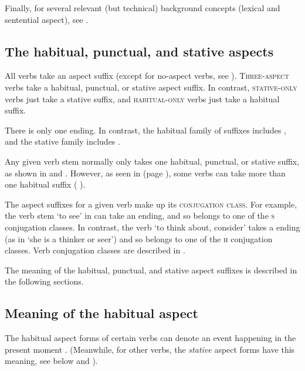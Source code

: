 Finally, for several relevant (but technical) background concepts (lexical and sentential aspect), see .



\subsection{The habitual, punctual, and stative aspects} \label{The habitual, punctual and stative aspects}
All verbs take an aspect suffix (except for no-aspect verbs, see ). \textsc{Three-aspect} verbs take a habitual, punctual, or stative aspect suffix. In contrast, \textsc{stative-only} verbs just take a stative suffix, and \textsc{habitual-only} verbs just take a habitual suffix.

There is only one  {\punctual} ending. In contrast, the habitual family of suffixes includes , and the stative family includes .

Any given verb stem normally only takes one habitual, punctual, or stative suffix, as shown in  and . However, as seen in  (page \pageref{ex:aspectex2}), some verbs can take more than one habitual suffix ( ).

The aspect suffixes for a given verb make up its \textsc{conjugation class}. For example, the verb stem  ‘to see’ in  can take an  \textsc{\habitual} ending, and so belongs to one of the \textsc{s} conjugation classes. In contrast, the verb  ‘to think about, consider’ takes a  \textsc{\habitual} ending (as in  ‘she is a thinker or seer’) and so belongs to one of the \textsc{h} conjugation classes. Verb conjugation classes are described in .

The meaning of the habitual, punctual, and stative aspect suffixes is described in the following sections. 


\subsection{Meaning of the habitual aspect} \label{Meaning of the habitual aspect}
The habitual aspect forms of certain verbs can denote an event happening in the present moment . (Meanwhile, for other verbs, the \emph{stative} aspect forms have this meaning, see below and ).

